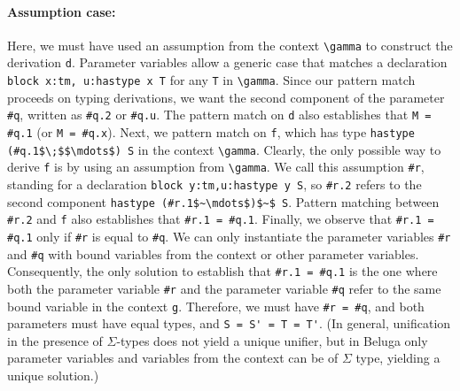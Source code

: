  \paragraph{Assumption case:} Here, we must have used an assumption from the
 context \lstinline!\gamma! to construct the derivation \lstinline{d}.  Parameter variables
  allow a generic case that matches a declaration 
\lstinline!block x:tm, u:hastype x T! for any \lstinline{T} in \lstinline!\gamma!. Since our pattern match
 proceeds on typing derivations, we want the second component of the
 parameter \lstinline{#q}, written as \lstinline{#q.2} or \lstinline!#q.u!.  The pattern match on \lstinline{d}
 also establishes that \lstinline{M = #q.1} (or \lstinline!M = #q.x!). 
 Next, we pattern match on \lstinline{f}, which has type
\lstinline!hastype (#q.1$\;$$\mdots$) S! in the context \lstinline!\gamma!.  Clearly, the only
 possible way to derive \lstinline{f} is by using an assumption from \lstinline!\gamma!. We call
 this assumption \lstinline{#r}, standing for a declaration 
\lstinline!block y:tm,u:hastype y S!, so \lstinline{#r.2} refers to the second component
\lstinline!hastype (#r.1$~\mdots$)$~$ S!. Pattern matching between \lstinline{#r.2} and \lstinline{f}
 also establishes that %
 \lstinline{#r.1 = #q.1}.  Finally, we observe that \lstinline{#r.1 = #q.1} only if
 \lstinline{#r} is equal to \lstinline{#q}. We can only instantiate the parameter
 variables \lstinline!#r! and \lstinline!#q! with bound variables from
 the context or other parameter variables. Consequently, the only
 solution to establish that \lstinline{#r.1 = #q.1} is the one where both the
 parameter variable \lstinline!#r! and the parameter variable
 \lstinline!#q! refer to the same bound variable in
 the context \lstinline!g!.  Therefore, we must have 
 \lstinline!#r = #q!, and both
 parameters must have equal types, and \lstinline{S = S' = T = T'}.  (In general,
 unification in the presence 
 of $\Sigma$-types does not yield a unique unifier, but in Beluga only
 parameter variables and variables from the context can be of $\Sigma$ type,
 yielding a unique solution.)


